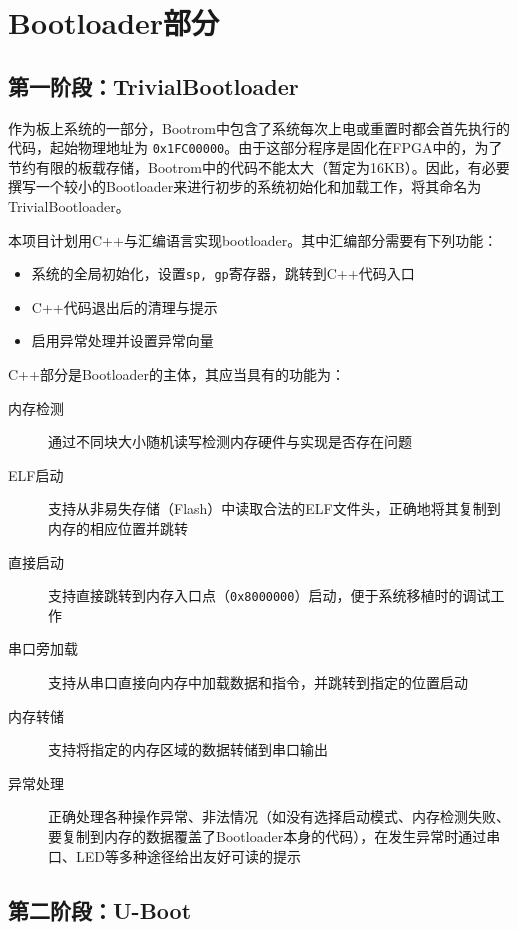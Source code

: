 \chapter{Bootloader部分}

\section{第一阶段：TrivialBootloader}

作为板上系统的一部分，Bootrom中包含了系统每次上电或重置时都会首先执行的代码，起始物理地址为 \texttt{0x1FC00000}。由于这部分程序是固化在FPGA中的，为了节约有限的板载存储，Bootrom中的代码不能太大（暂定为16KB）。因此，有必要撰写一个较小的Bootloader来进行初步的系统初始化和加载工作，将其命名为TrivialBootloader。

本项目计划用C++与汇编语言实现bootloader。其中汇编部分需要有下列功能：

\begin{itemize}
    \item 系统的全局初始化，设置\texttt{sp, gp}寄存器，跳转到C++代码入口
    \item C++代码退出后的清理与提示
    \item 启用异常处理并设置异常向量
\end{itemize}
C++部分是Bootloader的主体，其应当具有的功能为：

\begin{description}
    \item[内存检测] 通过不同块大小随机读写检测内存硬件与实现是否存在问题
    \item[ELF启动] 支持从非易失存储（Flash）中读取合法的ELF文件头，正确地将其复制到内存的相应位置并跳转
    \item[直接启动] 支持直接跳转到内存入口点（\texttt{0x8000000}）启动，便于系统移植时的调试工作
    \item[串口旁加载] 支持从串口直接向内存中加载数据和指令，并跳转到指定的位置启动
    \item[内存转储] 支持将指定的内存区域的数据转储到串口输出
    \item[异常处理] 正确处理各种操作异常、非法情况（如没有选择启动模式、内存检测失败、要复制到内存的数据覆盖了Bootloader本身的代码），在发生异常时通过串口、LED等多种途径给出友好可读的提示
\end{description}

\section{第二阶段：U-Boot}

